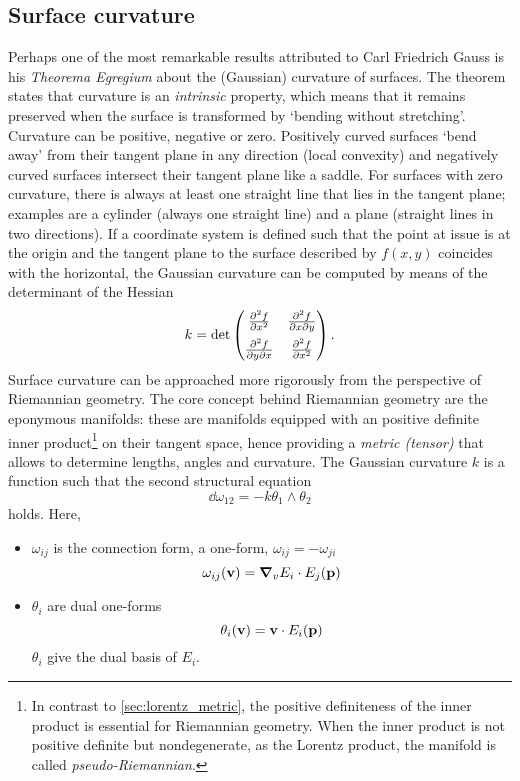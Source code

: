 \subsection{Surface curvature}
Perhaps one of the most remarkable results attributed to Carl Friedrich Gauss is his \emph{Theorema Egregium} about the (Gaussian) curvature of surfaces. The theorem states that curvature is an \emph{intrinsic} property, which means that it remains preserved when the surface is transformed by `bending without stretching'. Curvature can be positive, negative or zero. Positively curved surfaces `bend away' from their tangent plane in any direction (local convexity) and negatively curved surfaces intersect their tangent plane like a saddle. For surfaces with zero curvature, there is always at least one straight line that lies in the tangent plane; examples are a cylinder (always one straight line) and a plane (straight lines in two directions). If a coordinate system is defined such that the point at issue is at the origin and the tangent plane to the surface described by $f(x, y)$ coincides with the horizontal, the Gaussian curvature can be computed by means of the determinant of the Hessian \cite{Thurston1997, ONeill2006}
$$ k = \det \begin{pmatrix}
            \pdv[2]{f}{x} & \pdv{f}{x}{y}\\[6pt]
            \pdv{f}{y}{x} & \pdv[2]{f}{x}
    \end{pmatrix}.
$$
Surface curvature can be approached more rigorously from the perspective of Riemannian geometry. The core concept behind Riemannian geometry are the eponymous manifolds: these are manifolds equipped with an positive definite inner product\footnote{In contrast to \cref{sec:lorentz_metric}, the positive definiteness of the inner product is essential for Riemannian geometry. When the inner product is not positive definite but nondegenerate, as the Lorentz product, the manifold is called \emph{pseudo-Riemannian}.} on their tangent space, hence providing a \emph{metric (tensor)} that allows to determine lengths, angles and curvature. The Gaussian curvature $k$ is a function such that the second structural equation
$$\dd{\omega_{12}} = -k \theta_1 \wedge \theta_2$$
holds. Here, 
\begin{itemize}
    \item $\omega_{ij}$ is the connection form, a one-form, $
    \omega_{ij} = - \omega_{ji}$
    $$ \omega_{ij}(\vb{v}) = 
    \grad_v E_i \cdot E_j (\vb{p})$$
    \item $\theta_i$ are dual one-forms
    $$ \theta_i(\vb{v}) = \vb{v}\cdot E_i(\vb{p})$$
    $\theta_i$ give the dual basis of $E_i$.
\end{itemize}




